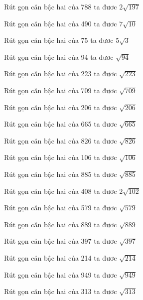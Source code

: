 \documentclass[12pt,a4paper]{article}
\begin{document}
\begin{ex}
Rút gọn căn bậc hai của 788 ta đươc $2\sqrt{197}$
\end{ex}
\begin{ex}
Rút gọn căn bậc hai của 490 ta đươc $7\sqrt{10}$
\end{ex}
\begin{ex}
Rút gọn căn bậc hai của 75 ta đươc $5\sqrt{3}$
\end{ex}
\begin{ex}
Rút gọn căn bậc hai của 94 ta đươc $\sqrt{94}$
\end{ex}
\begin{ex}
Rút gọn căn bậc hai của 223 ta đươc $\sqrt{223}$
\end{ex}
\begin{ex}
Rút gọn căn bậc hai của 709 ta đươc $\sqrt{709}$
\end{ex}
\begin{ex}
Rút gọn căn bậc hai của 206 ta đươc $\sqrt{206}$
\end{ex}
\begin{ex}
Rút gọn căn bậc hai của 665 ta đươc $\sqrt{665}$
\end{ex}
\begin{ex}
Rút gọn căn bậc hai của 826 ta đươc $\sqrt{826}$
\end{ex}
\begin{ex}
Rút gọn căn bậc hai của 106 ta đươc $\sqrt{106}$
\end{ex}
\begin{ex}
Rút gọn căn bậc hai của 885 ta đươc $\sqrt{885}$
\end{ex}
\begin{ex}
Rút gọn căn bậc hai của 408 ta đươc $2\sqrt{102}$
\end{ex}
\begin{ex}
Rút gọn căn bậc hai của 579 ta đươc $\sqrt{579}$
\end{ex}
\begin{ex}
Rút gọn căn bậc hai của 889 ta đươc $\sqrt{889}$
\end{ex}
\begin{ex}
Rút gọn căn bậc hai của 397 ta đươc $\sqrt{397}$
\end{ex}
\begin{ex}
Rút gọn căn bậc hai của 214 ta đươc $\sqrt{214}$
\end{ex}
\begin{ex}
Rút gọn căn bậc hai của 949 ta đươc $\sqrt{949}$
\end{ex}
\begin{ex}
Rút gọn căn bậc hai của 313 ta đươc $\sqrt{313}$
\end{ex}
\end{document}
